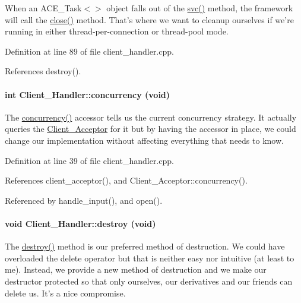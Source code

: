 When an ACE\_\-Task$<$$>$ object falls out of the \hyperlink{classClient__Handler_Client__Handlerb0}{svc()} method, the framework will call the \hyperlink{classClient__Handler_Client__Handlera3}{close()} method. That's where we want to cleanup ourselves if we're running in either thread-per-connection or thread-pool mode. 

Definition at line 89 of file client\_\-handler.cpp.

References destroy().\hypertarget{classClient__Handler_Client__Handlerb5}{
\paragraph[concurrency]{\setlength{\rightskip}{0pt plus 5cm}int Client\_\-Handler::concurrency (void)}\hfill}
\label{classClient__Handler_Client__Handlerb5}


The \hyperlink{classClient__Handler_Client__Handlerb5}{concurrency()} accessor tells us the current concurrency strategy. It actually queries the \hyperlink{classClient__Acceptor}{Client\_\-Acceptor} for it but by having the accessor in place, we could change our implementation without affecting everything that needs to know. 

Definition at line 39 of file client\_\-handler.cpp.

References client\_\-acceptor(), and Client\_\-Acceptor::concurrency().

Referenced by handle\_\-input(), and open().\hypertarget{classClient__Handler_Client__Handlera1}{
\paragraph[destroy]{\setlength{\rightskip}{0pt plus 5cm}void Client\_\-Handler::destroy (void)}\hfill}
\label{classClient__Handler_Client__Handlera1}


The \hyperlink{classClient__Handler_Client__Handlera1}{destroy()} method is our preferred method of destruction. We could have overloaded the delete operator but that is neither easy nor intuitive (at least to me). Instead, we provide a new method of destruction and we make our destructor protected so that only ourselves, our derivatives and our friends can delete us. It's a nice compromise. 

